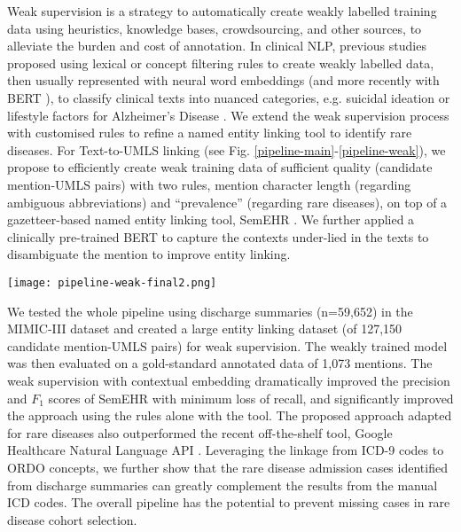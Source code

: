 \documentclass[letterpaper, 10 pt, conference]{ieeeconf}
\begin{document}
Weak supervision \cite{wang_clinical_2019,ratner2019} is a strategy to automatically create weakly labelled training data using heuristics, knowledge bases, crowdsourcing, and other sources, to alleviate the burden and cost of annotation. In clinical NLP, previous studies proposed using lexical or concept filtering rules to create weakly labelled data, then usually represented with neural word embeddings (and more recently with BERT \cite{devlin-etal-2019-bert}), to classify clinical texts \cite{wang_clinical_2019} into nuanced categories, e.g. suicidal ideation \cite{cusick2021} or lifestyle factors for Alzheimer's Disease \cite{shen2021}. We extend the weak supervision process with customised rules to refine a named entity linking tool to identify rare diseases. For Text-to-UMLS linking (see Fig. \ref{pipeline-main}-\ref{pipeline-weak}), we propose to efficiently create weak training data of sufficient quality (candidate mention-UMLS pairs) with two rules, mention character length (regarding ambiguous abbreviations) and ``prevalence'' (regarding rare diseases), on top of a gazetteer-based named entity linking tool, SemEHR \cite{Wu2018semehr}. We further applied a clinically pre-trained BERT \cite{peng2019transfer} to capture the contexts under-lied in the texts to disambiguate the mention to improve entity linking.

\begin{figure*}[ht]
  \centering
  \texttt{[image: pipeline-weak-final2.png]}
  \caption{Weak supervision process for Text-to-UMLS linking. The left four white text boxes displayed the metadata (with examples) of a candidate mention-UMLS pair, identified by SemEHR \cite{Wu2018semehr}; the coloured text boxes in the middle show the contextual representation block (in \colorbox{darkgreen}{\textcolor{white}{green}}) and the rule-based weak data labelling process (in \colorbox{darkblue}{\textcolor{white}{blue}}). A binary label is then generated, which weakly estimates whether the candidate pair indicates a correct phenotype of the patient. A phenotype confirmation model (in \colorbox{mediumgrey}{\textcolor{white}{grey}}) can then be learned to select correct phenotypes from the pairs.}\label{pipeline-weak}
\end{figure*}

We tested the whole pipeline using discharge summaries (n=59,652) in the MIMIC-III dataset \cite{johnson_mimic-iii_2016} and created a large entity linking dataset (of 127,150 candidate mention-UMLS pairs) for weak supervision. The weakly trained model was then evaluated on a gold-standard annotated data of 1,073 mentions. The weak supervision with contextual embedding dramatically improved the precision and $F_1$ scores of SemEHR with minimum loss of recall, and significantly improved the approach using the rules alone with the tool. The proposed approach adapted for rare diseases also outperformed the recent off-the-shelf tool, Google Healthcare Natural Language API \cite{Bodnari2020}. Leveraging the linkage from ICD-9 codes to ORDO concepts, we further show that the rare disease admission cases identified from discharge summaries can greatly complement the results from the manual ICD codes. The overall pipeline has the potential to prevent missing cases in rare disease cohort selection.
\end{document}
